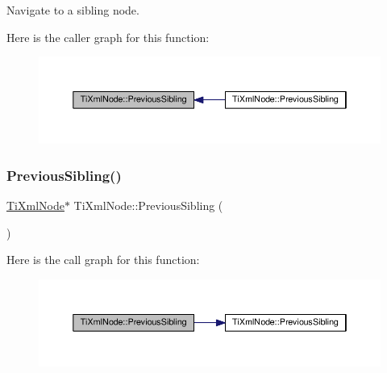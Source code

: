 Navigate to a sibling node. 

Here is the caller graph for this function\+:\nopagebreak
\begin{figure}[H]
\begin{center}
\leavevmode
\includegraphics[width=350pt]{class_ti_xml_node_a8aacf06b1a577ff0d7cfa502cc76da32_icgraph}
\end{center}
\end{figure}
\mbox{\label{class_ti_xml_node_af8c0642ad6ecc03f62953e68896ed1cc}} 
\subsubsection{\texorpdfstring{Previous\+Sibling()}{PreviousSibling()}\hspace{0.1cm}{\footnotesize\ttfamily [2/4]}}
{\footnotesize\ttfamily \hyperlink{class_ti_xml_node}{Ti\+Xml\+Node}$\ast$ Ti\+Xml\+Node\+::\+Previous\+Sibling (\begin{DoxyParamCaption}{ }\end{DoxyParamCaption})\hspace{0.3cm}{\ttfamily [inline]}}

Here is the call graph for this function\+:\nopagebreak
\begin{figure}[H]
\begin{center}
\leavevmode
\includegraphics[width=350pt]{class_ti_xml_node_af8c0642ad6ecc03f62953e68896ed1cc_cgraph}
\end{center}
\end{figure}
\mbox{\label{class_ti_xml_node_ace1b618fe58b2b9305fe89bfbc8dd17b}} 
